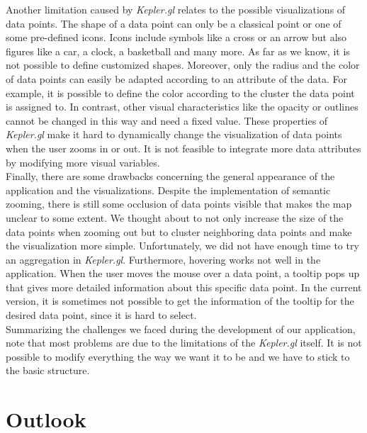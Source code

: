 \documentclass[sigconf, authorversion, nonacm=true]{acmart}
\begin{document}
Another limitation caused by \textit{Kepler.gl} relates to the possible visualizations of data points. The shape of a data point can only be a classical point or one of some pre-defined icons. Icons include symbols like a cross or an arrow but also figures like a car, a clock, a basketball and many more. As far as we know, it is not possible to define customized shapes. Moreover, only the radius and the color of data points can easily be adapted according to an attribute of the data. For example, it is possible to define the color according to the cluster the data point is assigned to. In contrast, other visual characteristics like the opacity or outlines cannot be changed in this way and need a fixed value. These properties of \textit{Kepler.gl} make it hard to dynamically change the visualization of data points when the user zooms in or out. It is not feasible to integrate more data attributes by modifying more visual variables.\\

Finally, there are some drawbacks concerning the general appearance of the application and the visualizations. Despite the implementation of semantic zooming, there is still some occlusion of data points visible that makes the map unclear to some extent. We thought about to not only increase the size of the data points when zooming out but to cluster neighboring data points and make the visualization more simple. Unfortunately, we did not have enough time to try an aggregation in \textit{Kepler.gl}. Furthermore, hovering works not well in the application. When the user moves the mouse over a data point, a tooltip pops up that gives more detailed information about this specific data point. In the current version, it is sometimes not possible to get the information of the tooltip for the desired data point, since it is hard to select.\\

Summarizing the challenges we faced during the development of our application, note that most problems are due to the limitations of the \textit{Kepler.gl} itself. It is not possible to modify everything the way we want it to be and we have to stick to the basic structure. 







\section{Outlook}
\label{sec:outlook}
\end{document}
